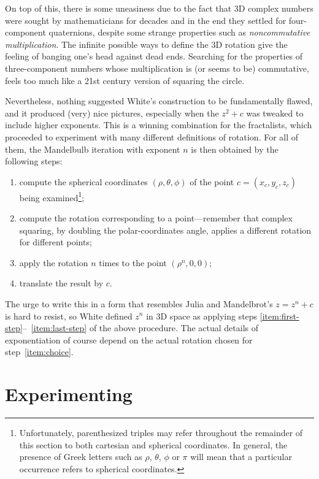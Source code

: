 \documentclass{article}
\begin{document}
On top of this, there is some uneasiness due to the fact that 3D
complex numbers were sought by mathematicians for decades and in the
end they settled for four-component quaternions, despite some strange
properties such as \emph{noncommutative multiplication}.  The infinite
possible ways to define the 3D rotation give the feeling of banging
one's head against dead ends.  Searching for the properties of
three-component numbers whose multiplication is (or seems to be)
commutative, feels too much like a 21st century version of squaring
the circle.

Nevertheless, nothing suggested White's construction to be
fundamentally flawed, and it produced (very) nice pictures, especially
when the $z^2+c$ was tweaked to include higher exponents.  This is a
winning combination for the fractalists, which proceeded to experiment
with many different definitions of rotation.  For all of them, the
Mandelbulb iteration with exponent $n$ is then obtained by the
following steps:
\begin{enumerate}
\item \label{item:first-step}
  compute the spherical coordinates $(\rho,\theta,\phi)$ of the
  point $c=(x_c,y_c,z_c)$ being examined\footnote{Unfortunately,
    parenthesized triples may refer throughout the remainder of this
    section to both cartesian and spherical coordinates.  In general,
    the presence of Greek letters such as $\rho$, $\theta$, $\phi$ or
    $\pi$ will mean that a particular occurrence refers to spherical
    coordinates.};

\item \label{item:choice} compute the rotation corresponding to a
  point---remember that complex squaring, by doubling the
  polar-coordinates angle, applies a different rotation for different
  points;

\item \label{item:last-step}
  apply the rotation $n$ times to the point $(\rho^n,0,0)$;
\item translate the result by $c$.
\end{enumerate}

The urge to write this in a form that resembles Julia and Mandelbrot's
$z=z^n+c$ is hard to resist, so White defined $z^n$ in 3D space as
applying steps \ref{item:first-step}--~\ref{item:last-step} of the
above procedure.  The actual details of exponentiation of course
depend on the actual rotation chosen for step~\ref{item:choice}.

\section{Experimenting}
\end{document}
